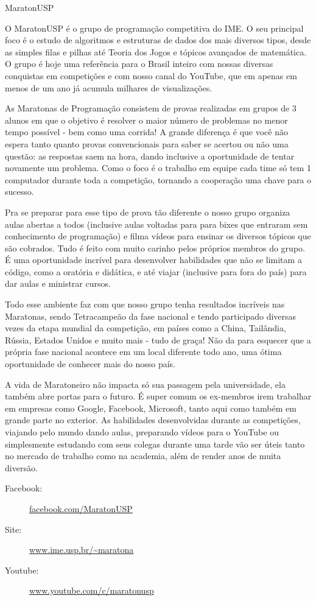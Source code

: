 \begin{subsecao}{MaratonUSP}

O MaratonUSP é o grupo de programação competitiva do IME. O seu principal foco é o estudo de algoritmos e estruturas de dados dos mais diversos tipos, desde as simples filas e pilhas até Teoria dos Jogos e tópicos avançados de matemática. O grupo é hoje uma referência para o Brasil inteiro com nossas diversas conquistas em competições e com nosso canal do YouTube, que em apenas em menos de um ano já acumula milhares de visualizações.

As Maratonas de Programação consistem de provas realizadas em grupos de 3 alunos em que o objetivo é resolver o maior número de problemas no menor tempo possível - bem como uma corrida! A grande diferença é que você não espera tanto quanto provas convencionais para saber se acertou ou não uma questão: as respostas saem na hora, dando inclusive a oportunidade de tentar novamente um problema. Como o foco é o  trabalho em equipe cada time só tem 1 computador durante toda a competição, tornando a cooperação uma chave para o sucesso.

Pra se preparar para esse tipo de prova tão diferente o nosso grupo organiza aulas abertas a todos (inclusive aulas voltadas para para bixes que entraram sem conhecimento de programação) e filma vídeos para ensinar os diversos tópicos que são cobrados. Tudo é feito com muito carinho pelos próprios membros do grupo. É uma oportunidade incrível para desenvolver habilidades que não se limitam a código, como a oratória e didática, e até viajar (inclusive para fora do país) para dar aulas e ministrar cursos.

Todo esse ambiente faz com que nosso grupo tenha resultados incríveis nas Maratonas, sendo Tetracampeão da fase nacional e tendo participado diversas vezes da etapa mundial da competição, em países como a China, Tailândia, Rússia, Estados Unidos e muito mais - tudo de graça! Não da para esquecer que a própria fase nacional acontece em um local diferente todo ano, uma ótima oportunidade de conhecer mais do nosso país.

A vida de Maratoneiro não impacta só sua passagem pela universidade, ela também abre portas para o futuro. É super comum os ex-membros irem trabalhar em empresas como Google, Facebook, Microsoft, tanto aqui como também em grande parte no exterior. As habilidades desenvolvidas durante as competições, viajando pelo mundo dando aulas, preparando vídeos para o YouTube ou simplesmente estudando com seus colegas durante uma tarde vão ser úteis tanto no mercado de trabalho como na academia, além de render anos de muita diversão.

\begin{description}
\item [Facebook:] \url{facebook.com/MaratonUSP}
\item[Site:] \url{www.ime.usp.br/~maratona}
\item[Youtube:] \url{www.youtube.com/c/maratonusp}
\end{description}

\end{subsecao}
